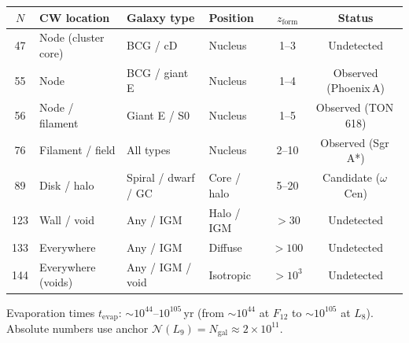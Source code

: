 \documentclass[12pt,a4paper]{article}
\begin{document}
\begin{table}[h!]
\medskip
\begin{tabular}{cl ll cc}
\toprule
$N$ & CW location & Galaxy type & Position & $z_{\mathrm{form}}$ & Status \\
\midrule
47 & Node (cluster core) & BCG / cD & Nucleus & 1--3 & Undetected \\
55 & Node & BCG / giant E & Nucleus & 1--4 & Observed (Phoenix\,A) \\
56 & Node / filament & Giant E / S0 & Nucleus & 1--5 & Observed (TON\,618) \\
76 & Filament / field & All types & Nucleus & 2--10 & Observed (Sgr\,A*) \\
89 & Disk / halo & Spiral / dwarf / GC & Core / halo & 5--20 & Candidate ($\omega$\,Cen) \\
123 & Wall / void & Any / IGM & Halo / IGM & $>30$ & Undetected \\
133 & Everywhere & Any / IGM & Diffuse & $>100$ & Undetected \\
144 & Everywhere (voids) & Any / IGM / void & Isotropic & $>10^3$ & Undetected \\
\bottomrule
\end{tabular}
\medskip
\raggedright
\footnotesize
Evaporation times $t_{\mathrm{evap}}$: $\sim 10^{44}$--$10^{105}$\,yr (from $\sim 10^{44}$ at $F_{12}$ to $\sim 10^{105}$ at $L_8$). Absolute numbers use anchor $\mathcal{N}(L_9)=N_{\mathrm{gal}}\approx 2\times 10^{11}$.
\end{table}
\end{document}

